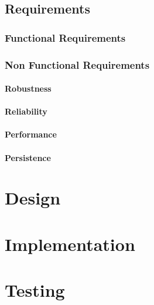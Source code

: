 \documentclass[a4paper,12pt]{book}
\begin{document}
\chapter{Requirements}
\section{Functional Requirements}
\section{Non Functional Requirements}
\subsection{Robustness}
\subsection{Reliability}
\subsection{Performance}
\subsection{Persistence}

\part{Design}

\part{Implementation}

\part{Testing}
\end{document}
